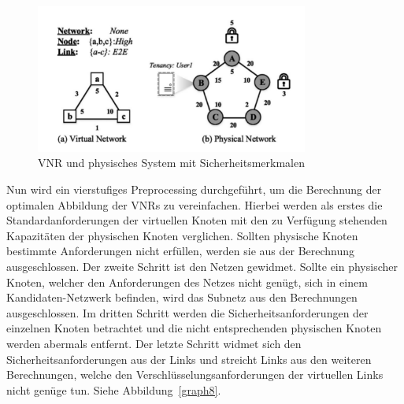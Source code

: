 \documentclass{lni}
\begin{document}
\begin{figure}[htb]
\begin{center}
\includegraphics[width=0.8\textwidth]{SVNR.pdf}\newline
\caption{\label{graph7}VNR und physisches System mit Sicherheitsmerkmalen \cite{wang2016towards}}
\end{center}
\end{figure}

Nun wird ein vierstufiges Preprocessing durchgeführt, um die Berechnung der optimalen Abbildung der VNRs zu vereinfachen. Hierbei werden als erstes die Standardanforderungen der virtuellen Knoten mit den zu Verfügung stehenden Kapazitäten der physischen Knoten verglichen. Sollten physische Knoten bestimmte Anforderungen nicht erfüllen, werden sie aus der Berechnung ausgeschlossen. Der zweite Schritt ist den Netzen gewidmet. Sollte ein physischer Knoten, welcher den Anforderungen des Netzes nicht genügt, sich in einem Kandidaten-Netzwerk befinden, wird das Subnetz aus den Berechnungen ausgeschlossen. Im dritten Schritt werden die Sicherheitsanforderungen der einzelnen Knoten betrachtet und die nicht entsprechenden physischen Knoten werden abermals entfernt. Der letzte Schritt widmet sich den Sicherheitsanforderungen aus der Links und streicht Links aus den weiteren Berechnungen, welche den Verschlüsselungsanforderungen der virtuellen Links nicht genüge tun. Siehe Abbildung~\ref{graph8}.
\end{document}
